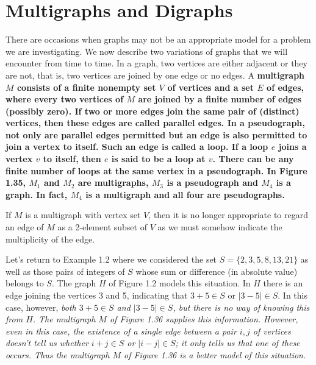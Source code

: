 \section{Multigraphs and Digraphs}
There are occasions when graphs may not be an appropriate model for a problem we are investigating. We now describe two variations of graphs that we will encounter from time to time. In a graph, two vertices are either adjacent or they are not, that is, two vertices are joined by one edge or no edges. A \bf{multigraph} $M$ consists of a finite nonempty set $V$ of vertices and a set $E$ of edges, where every two vertices of $M$ are joined by a finite number of edges (possibly zero). If two or more edges join the same pair of (distinct) vertices, then these edges are called \bf{parallel edges}. In a \bf{pseudograph}, not only are parallel edges permitted but an edge is also permitted to join a vertex to itself. Such an edge is called a \bf{loop}. If a loop $e$ joins a vertex $v$ to itself, then $e$ is said to be a loop at $v$. There can be any finite number of loops at the same vertex in a pseudograph. In Figure 1.35, $M_{1}$ and $M_{2}$ are multigraphs, $M_{3}$ is a pseudograph and $M_{4}$ is a graph. In fact, $M_{4}$ is a multigraph and all four are pseudographs.



If $M$ is a multigraph with vertex set $V$, then it is no longer appropriate to regard an edge of $M$ as a 2-element subset of $V$ as we must somehow indicate the multiplicity of the edge.

Let's return to Example 1.2 where we considered the set $S = \{2,3,5,8,13,21\}$ as well as those pairs of integers of $S$ whose sum or difference (in absolute value) belongs to $S$. The graph $H$ of Figure 1.2 models this situation. In $H$ there is an edge joining the vertices 3 and 5, indicating that $3+5 \in S$ or $|3-5| \in S$. In this case, however, \it{both} $3+5 \in S$ and $|3-5| \in S$, but there is no way of knowing this from $H$. The multigraph $M$ of Figure 1.36 supplies this information. However, even in this case, the existence of a single edge between a pair $i,j$ of vertices doesn't tell us whether $i+j \in S$ or $|i-j| \in S$; it only tells us that one of these occurs. Thus the multigraph $M$ of Figure 1.36 is a better model of this situation.



